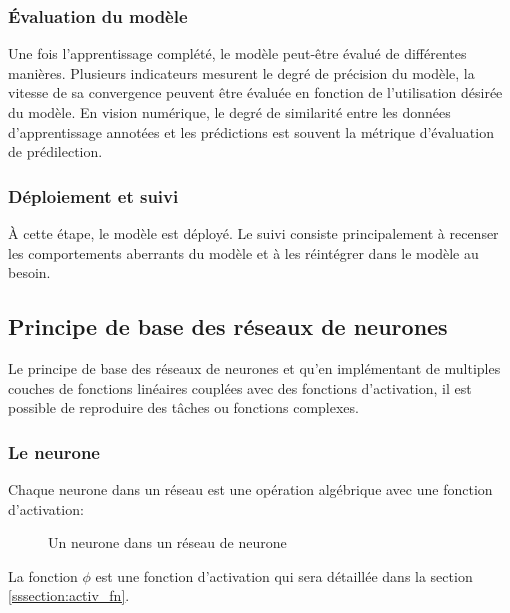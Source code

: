     \subsubsection{Évaluation du modèle}
      Une fois l'apprentissage complété, le modèle peut-être évalué de différentes manières. Plusieurs indicateurs mesurent le degré de précision du modèle, la vitesse de sa convergence peuvent être évaluée en fonction de l'utilisation désirée du modèle. En vision numérique, le degré de similarité entre les données d'apprentissage annotées et les prédictions est souvent la métrique d'évaluation de prédilection.
    \subsubsection{Déploiement et suivi}
      À cette étape, le modèle est déployé. Le suivi consiste principalement à recenser les comportements aberrants du modèle et à les réintégrer dans le modèle au besoin. 
  \subsection{Principe de base des réseaux de neurones}
  Le principe de base des réseaux de neurones et qu'en implémentant de multiples couches de fonctions linéaires couplées avec des fonctions d'activation, il est possible de reproduire des tâches ou fonctions complexes. 
    \subsubsection{Le neurone}
      Chaque neurone dans un réseau est une opération algébrique avec une fonction d'activation:

        \begin{figure}[!h]
          \centering
          \caption{Un neurone dans un réseau de neurone}
          \label{fig:neurone}
        \end{figure}
      La fonction $\phi $ est une fonction d'activation qui sera détaillée dans la section \ref{sssection:activ_fn}.
      \FloatBarrier
